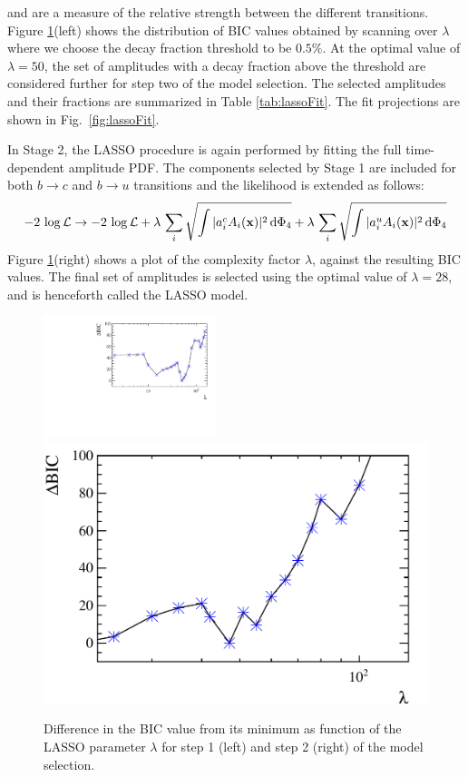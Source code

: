 and are a measure of the relative strength between the different transitions. 
Figure \ref{fig:BIC}(left) shows the distribution of BIC values obtained by scanning over $\lambda$
where we choose the decay fraction threshold to be $0.5 \%$.
At the optimal value of $\lambda=50$, the set of amplitudes with a decay fraction above the threshold 
are considered further for step two of the model selection.
The selected amplitudes and their fractions are summarized in Table \ref{tab:lassoFit}.
The fit projections are shown in Fig.~\ref{fig:lassoFit}.

\clearpage

In Stage 2, the LASSO procedure is again performed by fitting the full time-dependent amplitude PDF.
The components selected by Stage 1 are included for both $b\to c$ and $b\to u$ transitions and the likelihood is extended as follows:
\begin{equation}
	-2 \, \log \mathcal L \rightarrow -2 \, \log \mathcal L + \lambda \, \sum_{i} \sqrt{ \int \vert a^{c}_i  A_i(\mathbf{x}) \vert^{2} \, \text{d}\Phi_{4}  }  + \lambda \, \sum_{i} \sqrt{ \int \vert a^{u}_i  A_i(\mathbf{x}) \vert^{2} \, \text{d}\Phi_{4}  } 
\end{equation}
Figure \ref{fig:BIC}(right) shows a plot of the complexity factor
$\lambda$, against the resulting BIC values. 
The final set of amplitudes is selected using the optimal value of $\lambda=28$, and is henceforth called the LASSO model.

\begin{figure}[b]
  \centering
  \includegraphics[width=0.45\textwidth, height=!]{figs/lassoFit/Lasso_BIC.pdf} 
  \includegraphics[width=0.45\linewidth, height=!]{figs/fullFit/ReLasso_BIC.pdf}
  \caption{Difference in the BIC value from its minimum as function of the LASSO parameter $\lambda$ for step 1 (left) and step 2 (right) of the model selection.}
  \label{fig:BIC}
\end{figure}

